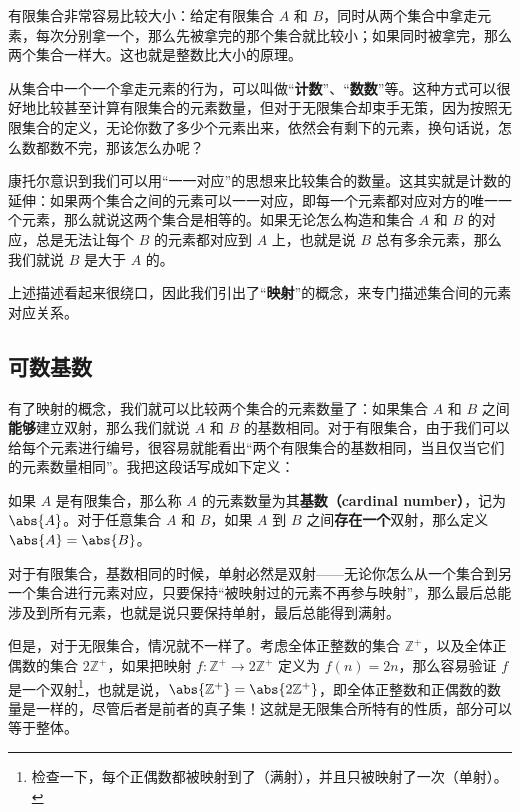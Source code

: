 有限集合非常容易比较大小：给定有限集合 $A$ 和 $B$，同时从两个集合中拿走元素，每次分别拿一个，那么先被拿完的那个集合就比较小；如果同时被拿完，那么两个集合一样大。这也就是整数比大小的原理。

从集合中一个一个拿走元素的行为，可以叫做“\textbf{计数}”、“\textbf{数数}”等。这种方式可以很好地比较甚至计算有限集合的元素数量，但对于无限集合却束手无策，因为按照无限集合的定义，无论你数了多少个元素出来，依然会有剩下的元素，换句话说，怎么数都数不完，那该怎么办呢？

康托尔意识到我们可以用“一一对应”的思想来比较集合的数量。这其实就是计数的延伸：如果两个集合之间的元素可以一一对应，即每一个元素都对应对方的唯一一个元素，那么就说这两个集合是相等的。如果无论怎么构造和集合 $A$ 和 $B$ 的对应，总是无法让每个 $B$ 的元素都对应到 $A$ 上，也就是说 $B$ 总有多余元素，那么我们就说 $B$ 是大于 $A$ 的。

上述描述看起来很绕口，因此我们引出了“\textbf{映射}”的概念，来专门描述集合间的元素对应关系。



\subsection{可数基数}\label{CardiN_sub1}


有了映射的概念，我们就可以比较两个集合的元素数量了：如果集合 $A$ 和 $B$ 之间\textbf{能够}建立双射，那么我们就说 $A$ 和 $B$ 的基数相同。对于有限集合，由于我们可以给每个元素进行编号，很容易就能看出“两个有限集合的基数相同，当且仅当它们的元素数量相同”。我把这段话写成如下定义：

\begin{definition}{}\label{CardiN_def1}
如果 $A$ 是有限集合，那么称 $A$ 的元素数量为其\textbf{基数（cardinal number）}，记为 $\abs{A}$。对于任意集合 $A$ 和 $B$，如果 $A$ 到 $B$ 之间\textbf{存在一个}双射，那么定义 $\abs{A}=\abs{B}$。
\end{definition}


对于有限集合，基数相同的时候，单射必然是双射——无论你怎么从一个集合到另一个集合进行元素对应，只要保持“被映射过的元素不再参与映射”，那么最后总能涉及到所有元素，也就是说只要保持单射，最后总能得到满射。

但是，对于无限集合，情况就不一样了。考虑全体正整数的集合 $\mathbb{Z}^+$，以及全体正偶数的集合 $2\mathbb{Z}^+$，如果把映射 $f:\mathbb{Z}^+\rightarrow2\mathbb{Z}^+$ 定义为 $f(n)=2n$，那么容易验证 $f$ 是一个双射\footnote{检查一下，每个正偶数都被映射到了（满射），并且只被映射了一次（单射）。}，也就是说，$\abs{\mathbb{Z}^+}=\abs{2\mathbb{Z}^+}$，即全体正整数和正偶数的数量是一样的，尽管后者是前者的真子集！这就是无限集合所特有的性质，部分可以等于整体。


